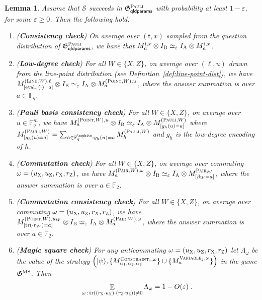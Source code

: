\documentclass[11pt]{article}
\newtheorem{lemma}[theorem]{Lemma}
\theoremstyle{definition}
\newcommand{\ket}[1]{|#1\rangle}
\newcommand{\Id}{\ensuremath{I}}
\newcommand{\F}{\ensuremath{\mathbb{F}}}
\newcommand{\eps}{\varepsilon}
\DeclareMathOperator{\tr}{tr}
\newcommand{\E}{\mathop{\mathbb{E}}\displaylimits}
\newcommand{\game}{\mathfrak{G}}
\newcommand{\strategy}{\mathscr{S}}
\newcommand{\gamestyle}[1]{\ensuremath{\textsc{#1}}\xspace}
\newcommand{\ms}{\gamestyle{MS}}
\newcommand{\pauli}{\gamestyle{Pauli}}
\newcommand{\labelstyle}[1]{\ensuremath{\textsc{#1}}\xspace}
\newcommand{\xpt}{\labelstyle{X}}
\newcommand{\zpt}{\labelstyle{Z}}
\newcommand{\tvarstyle}[1]{\mathsf{#1}}
\newcommand{\tvar}{\ensuremath{\tvarstyle{t}}}
\newcommand{\alice}{\labelstyle{A}}
\newcommand{\bob}{\labelstyle{B}}
\newcommand{\typestyle}[1]{\ensuremath{\textsc{#1}}\xspace}
\renewcommand{\line}{\mathbf{\ell}}
\newcommand{\Point}{\typestyle{Point}}
\newcommand{\Line}{\typestyle{Line}}
\newcommand{\Pair}{\typestyle{Pair}}
\newcommand{\Constraint}{\typestyle{Constraint}}
\newcommand{\Variable}{\typestyle{Variable}}
\newcommand{\Pauli}{\typestyle{Pauli}}
\newcommand{\qldparams}{\mathsf{qldparams}}
\newcommand{\eval}{\mathrm{eval}}
\begin{document}
\begin{lemma}
\label{lem:qld-win-implications}
Assume that $\strategy$ succeeds in $\game^\pauli_\qldparams$ with probability at least $1-\eps$, for some $\eps\geq 0$. Then the following hold: 
	\begin{enumerate}
		\item \label{enu:qld-cons} (\textbf{Consistency check}) On average over $(\tvar,x)$ sampled from the question distribution of $\game^\pauli_\qldparams$, we have that $M^{\tvar,x}_a \otimes \Id_\bob \simeq_\eps \Id_\alice \otimes M^{\tvar,x}_a$.
		\item \label{enu:qld-ld} (\textbf{Low-degree check})
                  For all $W \in \{X,Z\}$, on average over $(\line,u)$
                  drawn from the line-point distribution (see
                  Definition~\ref{def:line-point-dist}), we
                  have $M^{(\Line,W),\line}_{[\eval_u(\cdot) = a]} \otimes \Id_\bob \simeq_\eps \Id_\alice \otimes M^{(\Point,W),u}_a$, where the answer summation is over $a \in \F_q$. 
		
	\item \label{enu:qld-pauli-basis-cons} (\textbf{Pauli basis consistency check}) For all $W \in \{X,Z\}$, on average over $u \in \F_q^m$, we have $M^{(\Point,W),u}_a \otimes \Id_\bob \simeq_\eps \Id_\alice \otimes M^{(\Pauli,W)}_{[g_h(u)=a]}$ where $M^{(\Pauli,W)}_{[g_h(u)=a]} = \sum_{h \in \F_q^{\nqubits} : g_h(u) = a} M^{(\Pauli,W)}_h$ and $g_h$ is the low-degree encoding of $h$. 
	
		\item \label{enu:qld-comm} (\textbf{Commutation check}) For all $W \in \{X,Z\}$, on average over commuting $\omega = (u_\xpt,u_\zpt,r_\xpt,r_\zpt)$, we have $M^{(\Pair,W),\omega}_a \otimes \Id_\bob \simeq_\eps \Id_\alice \otimes M^{\Pair,\omega}_{[\beta_W = a]}$, where the answer summation is over $a \in \F_2$.
		\item \label{enu:qld-comm-cons} (\textbf{Commutation consistency check}) For all $W \in \{X,Z\}$, on average over commuting $\omega = (u_\xpt,u_\zpt,r_\xpt,r_\zpt)$, we have $M^{(\Point,W),u_W}_{[\tr(\cdot r_W) = a]} \otimes \Id_\bob \simeq_\eps \Id_\alice \otimes M^{(\Pair,W),\omega}_{a}$, where the answer summation is over $a\in \F_2$.
		
		\item\label{enu:qld-ms} (\textbf{Magic square check}) For any anticommuting $\omega = (u_\xpt,u_\zpt,r_\xpt,r_\zpt)$ let $\Lambda_\omega$ be the value of the strategy $\Big (\ket{\psi}, \{M^{\Constraint_i,\omega}_{\alpha_1,\alpha_2,\alpha_3}\} \cup \{M^{\Variable_j,\omega}_a \} \Big )$ in the game $\game^\ms$. Then 
		\[
			\E_{\omega \, : \, \tr((r_\xpt \cdot
                          u_\xpt) \cdot (r_\zpt \cdot u_\zpt)) \neq 0} \Lambda_\omega = 1 - O(\eps)\;.
		\]


\end{enumerate}
\end{lemma}
\end{document}
